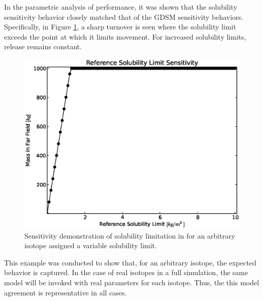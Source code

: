 In the parametric analysis of \Cyder performance, it was shown that the 
solubility sensitivity behavior closely matched that of the \gls{GDSM} 
sensitivity behaviors. Specifically, in Figure \ref{fig:sol_result}, a sharp turnover 
is seen where the solubility limit exceeds the point at which it limits 
movement. For increased solubility limits, release remains constant.

\begin{figure}[htbp!]
\begin{center}
\includegraphics[width=0.7\linewidth]{./sol.eps}
\end{center}
\caption[Solubility Sensitivity in the Mixed Cell Model]{Sensitivity demonstration of solubility limitation in \Cyder for an 
arbitrary isotope assigned a variable solubility limit. }
\label{fig:sol_result}
\end{figure}

This example was conducted to show that, for an arbitrary isotope, the expected 
behavior is captured. In the case of real isotopes in a full simulation, the 
same model will be invoked with real parameters for each isotope. Thus, the 
this model agreement is representative in all cases.

